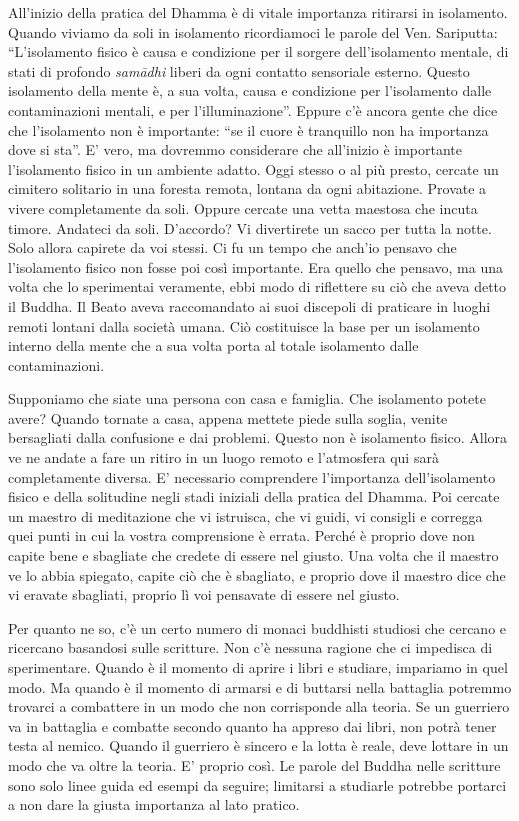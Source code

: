 All'inizio della pratica del Dhamma è di vitale importanza ritirarsi in
isolamento. Quando viviamo da soli in isolamento ricordiamoci le parole
del Ven. Sariputta: ``L'isolamento fisico è causa e condizione per il
sorgere dell'isolamento mentale, di stati di profondo \emph{samādhi} liberi da
ogni contatto sensoriale esterno. Questo isolamento della mente è, a sua
volta, causa e condizione per l'isolamento dalle contaminazioni mentali,
e per l'illuminazione''. Eppure c'è ancora gente che dice che
l'isolamento non è importante: ``se il cuore è tranquillo non ha
importanza dove si sta''. E' vero, ma dovremmo considerare che
all'inizio è importante l'isolamento fisico in un ambiente adatto. Oggi
stesso o al più presto, cercate un cimitero solitario in una foresta
remota, lontana da ogni abitazione. Provate a vivere completamente da
soli. Oppure cercate una vetta maestosa che incuta timore. Andateci da
soli. D'accordo? Vi divertirete un sacco per tutta la notte. Solo allora
capirete da voi stessi. Ci fu un tempo che anch'io pensavo che
l'isolamento fisico non fosse poi così importante. Era quello che
pensavo, ma una volta che lo sperimentai veramente, ebbi modo di
riflettere su ciò che aveva detto il Buddha. Il Beato aveva raccomandato
ai suoi discepoli di praticare in luoghi remoti lontani dalla società
umana. Ciò costituisce la base per un isolamento interno della mente che
a sua volta porta al totale isolamento dalle contaminazioni.

Supponiamo che siate una persona con casa e famiglia. Che isolamento
potete avere? Quando tornate a casa, appena mettete piede sulla soglia,
venite bersagliati dalla confusione e dai problemi. Questo non è
isolamento fisico. Allora ve ne andate a fare un ritiro in un luogo
remoto e l'atmosfera qui sarà completamente diversa. E' necessario
comprendere l'importanza dell'isolamento fisico e della solitudine negli
stadi iniziali della pratica del Dhamma. Poi cercate un maestro di
meditazione che vi istruisca, che vi guidi, vi consigli e corregga quei
punti in cui la vostra comprensione è errata. Perché è proprio dove non
capite bene e sbagliate che credete di essere nel giusto. Una volta che
il maestro ve lo abbia spiegato, capite ciò che è sbagliato, e proprio
dove il maestro dice che vi eravate sbagliati, proprio lì voi pensavate
di essere nel giusto.

Per quanto ne so, c'è un certo numero di monaci buddhisti studiosi che
cercano e ricercano basandosi sulle scritture. Non c'è nessuna ragione
che ci impedisca di sperimentare. Quando è il momento di aprire i libri
e studiare, impariamo in quel modo. Ma quando è il momento di armarsi e
di buttarsi nella battaglia potremmo trovarci a combattere in un modo
che non corrisponde alla teoria. Se un guerriero va in battaglia e
combatte secondo quanto ha appreso dai libri, non potrà tener testa al
nemico. Quando il guerriero è sincero e la lotta è reale, deve lottare
in un modo che va oltre la teoria. E' proprio così. Le parole del Buddha
nelle scritture sono solo linee guida ed esempi da seguire; limitarsi a
studiarle potrebbe portarci a non dare la giusta importanza al lato
pratico.

